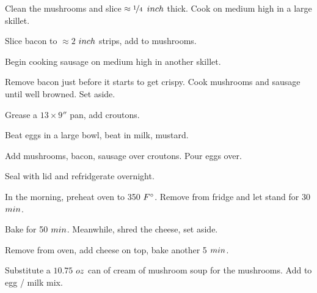 \begin{preparation}
\item Clean the mushrooms and slice $\approx\onefourth$ $\inch$ thick.
	Cook on medium high in a large skillet.

\item Slice bacon to $\approx2$ $\inch$ strips, add to mushrooms.

\item Begin cooking sausage on medium high in another skillet.

\item Remove bacon just before it starts to get crispy.
	Cook mushrooms and sausage until well browned.
	Set aside.

\item Grease a $13\times9''$ pan, add croutons.

\item Beat eggs in a large bowl, beat in milk, mustard.

\item Add mushrooms, bacon, sausage over croutons.
	Pour eggs over.

\item Seal with lid and refridgerate overnight.

\item In the morning, preheat oven to 350 $\Fahrenheit$.
	Remove from fridge and let stand for 30 $\minute$.

\item Bake for 50 $\minute$.
	Meanwhile, shred the cheese, set aside.

\item Remove from oven, add cheese on top, bake another 5 $\minute$.
\end{preparation}


\begin{variation}
\item Substitute a $10.75$ $\ounce$ can of cream of mushroom soup for the mushrooms.
	Add to egg / milk mix.
\end{variation}


\recipeend%

